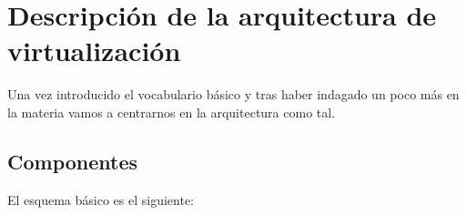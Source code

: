 \chapter{Descripción de la arquitectura de virtualización}

\lettrine[lines=1,slope=4pt,findent=0pt]{U}{}na vez introducido el vocabulario básico y tras haber indagado un poco más en la materia vamos a centrarnos en la arquitectura como tal.

\section{Componentes}

\noindent El esquema básico es el siguiente:

\begin{center}
\end{center}